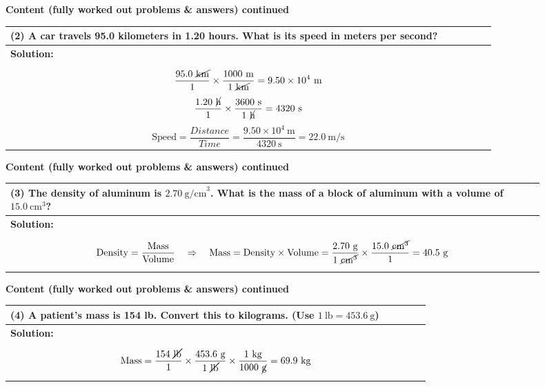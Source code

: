 \documentclass{article}
\begin{document}
\noindent
{\large \textbf{Content (fully worked out problems \& answers) continued}} \\[0.2em]
\begin{tabular}{|p{0.9\linewidth}|}
\hline
\vspace{0.2cm}

\textbf{(2)} A car travels 95.0 kilometers in 1.20 hours. What is its speed in meters per second? \\
\hline
\textbf{Solution:} \\
\[
\frac{95.0~\cancel{\text{km}}}{1} \times \frac{1000~\text{m}}{1~\cancel{\text{km}}} 
= 9.50 \times 10^4~\text{m}
\]
\[
\frac{1.20~\cancel{\text{h}}}{1} \times \frac{3600~\text{s}}{1~\cancel{\text{h}}} 
= 4320~\text{s}
\]
\[
\text{Speed} = \frac{Distance}{Time}
= \frac{9.50 \times 10^4~\text{m}}{4320~\text{s}} 
= 22.0~\text{m/s}
\] \\
\hline
\end{tabular}
\newpage

\noindent
{\large \textbf{Content (fully worked out problems \& answers) continued}} \\[0.2em]
\begin{tabular}{|p{0.9\linewidth}|}
\hline
\vspace{0.2cm}

\textbf{(3)} The density of aluminum is $2.70~\text{g/cm}^3$. What is the mass of a block of aluminum with a volume of $15.0~\text{cm}^3$? \\
\hline
\textbf{Solution:} \\
\[
\text{Density} = \frac{\text{Mass}}{\text{Volume}} \quad \Rightarrow \quad \text{Mass} = \text{Density} \times \text{Volume}
= \frac{2.70~\text{g}}{1~\cancel{\text{cm}^3}} \times \frac{15.0~\cancel{\text{cm}^3}}{1} 
= 40.5~\text{g}
\] \\
\hline
\end{tabular}
\newpage

\noindent
{\large \textbf{Content (fully worked out problems \& answers) continued}} \\[0.2em]
\begin{tabular}{|p{0.9\linewidth}|}
\hline
\vspace{0.2cm}

\textbf{(4)} A patient’s mass is 154 lb. Convert this to kilograms. (Use $1~\text{lb} = 453.6~\text{g}$) \\
\hline
\textbf{Solution:} \\
\[
\text{Mass} = \frac{154~\cancel{\text{lb}}}{1} \times \frac{453.6~\text{g}}{1~\cancel{\text{lb}}} \times \frac{1~\text{kg}}{1000~\cancel{\text{g}}}
= 69.9~\text{kg}
\] \\
\hline
\end{tabular}
\newpage
\end{document}
